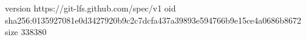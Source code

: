version https://git-lfs.github.com/spec/v1
oid sha256:0135927081e0d3427920b9c2c7dcfa437a39893e594766b9e15ce4a0686b8672
size 338380
